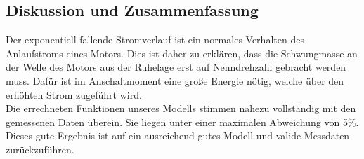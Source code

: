 \subsection{Diskussion und Zusammenfassung}

Der exponentiell fallende Stromverlauf ist ein normales Verhalten des Anlaufstroms eines
Motors. Dies ist daher zu erklären, dass die Schwungmasse an der Welle des Motors aus
der Ruhelage erst auf Nenndrehzahl gebracht werden muss. Dafür ist im Anschaltmoment
eine große Energie nötig, welche über den erhöhten Strom zugeführt wird.\\

Die errechneten Funktionen unseres Modells stimmen nahezu vollständig mit den gemessenen
Daten überein. Sie liegen unter einer maximalen Abweichung von 5\%. Dieses gute Ergebnis
ist auf ein ausreichend gutes Modell und valide Messdaten zurückzuführen.\\